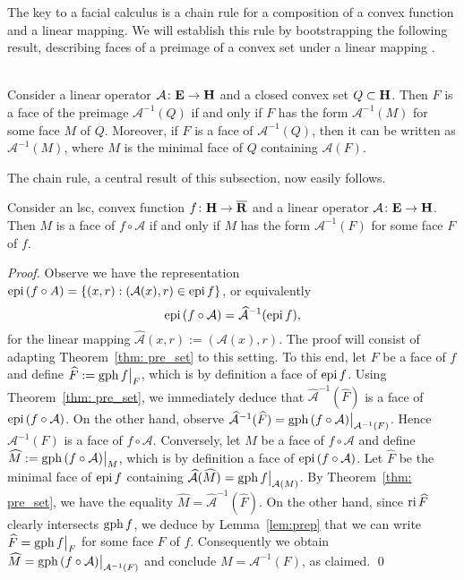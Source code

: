 \documentclass[smallextended,numbook]{svjour3}
\begin{document}
The key to a facial calculus is a chain rule for a composition of a convex function and a linear mapping. We will establish this rule by bootstrapping the following result, describing faces of a preimage of  a convex set under a linear mapping \cite{handbook}.
\begin{thm}\label{thm: pre_set} \hfill \\
Consider a linear operator $\mathcal{A}\colon{{\bf E}}\to{\bf H}$ and a closed convex set $Q\subset{\bf H}$. Then
$F$ is a face of the preimage $\mathcal{A}^{-1}(Q)$ if and only if $F$ has the form $\mathcal{A}^{-1}(M)$ for some face $M$ of $Q$. Moreover, if $F$ is a face of $\mathcal{A}^{-1}(Q)$, then it can be written as $\mathcal{A}^{-1}(M)$, where $M$ is the minimal face of $Q$ containing ${\mathcal{A}}(F)$.
\end{thm}

The chain rule, a central result of this subsection, now easily follows. 
\begin{thm}\label{thm:chain_gen}
Consider an lsc, convex function $f\colon{\bf H}\to\overline{{\bf R}}$ and a linear operator $\mathcal{A}\colon{{\bf E}}\to{\bf H}$. Then $M$ is a face of $f\circ\mathcal{A}$ if and only if $M$ has the form $\mathcal{A}^{-1}(F)$ for some face $F$ of $f$.
\end{thm}
\begin{proof}
Observe we have the representation ${\mbox{\rm epi}\,} (f\circ A)=\{(x,r):(\mathcal{A}(x),r)\in{\mbox{\rm epi}\,} f\}$, or equivalently 
$${\mbox{\rm epi}\,} (f\circ {\mathcal{A}})=\widehat{\mathcal{A}}^{-1}({\mbox{\rm epi}\,} f),$$
for the linear mapping $\widehat{\mathcal{A}}(x,r):=(\mathcal{A}(x),r)$. The proof will consist of adapting Theorem~\ref{thm: pre_set} to this setting. To this end,
let $F$ be a face of $f$ and define $\widehat{F}:={\mbox{\rm gph}\,} f\big|_F$, which is by definition a face of ${\mbox{\rm epi}\,} f$. Using Theorem~\ref{thm: pre_set}, we immediately deduce that $\widehat{\mathcal{A}}^{-1}(\widehat{F})$ is a face of ${\mbox{\rm epi}\,} (f\circ {\mathcal{A}})$.
On the other hand, observe $\widehat{\mathcal{A}}^{-1}(\widehat{F})= {\mbox{\rm gph}\,} (f\circ {\mathcal{A}})\big|_{{\mathcal{A}}^{-1}(F)}$. Hence $\mathcal{A}^{-1}(F)$ is a face of $f\circ{\mathcal{A}}$. Conversely, let $M$ be a face of $f\circ{\mathcal{A}}$ and define $\widehat{M}:={\mbox{\rm gph}\,} (f\circ{\mathcal{A}})\big|_M$, which is by definition a face of ${\mbox{\rm epi}\,} (f\circ{\mathcal{A}})$.
Let $\widehat{F}$ be the minimal face of ${\mbox{\rm epi}\,} f$ containing $\widehat{\mathcal{A}}(\widehat{M})= {\mbox{\rm gph}\,} f\big|_{{\mathcal{A}}(M)}$.  By Theorem~\ref{thm: pre_set}, we have the equality $\widehat{M}=\widehat{\mathcal{A}}^{-1}(\widehat{F})$. On the other hand, since ${\mbox{\rm ri}\,} \widehat{F}$ clearly intersects ${\mbox{\rm gph}\,} f$, we deduce by Lemma~\ref{lem:prep} that we can write $\widehat{F}={\mbox{\rm gph}\,} f\big|_F$ for some face $F$ of $f$. Consequently we obtain $\widehat{M}={\mbox{\rm gph}\,} (f\circ{\mathcal{A}})\big|_{{\mathcal{A}}^{-1}(F)}$ and conclude $M={\mathcal{A}}^{-1}(F)$, as claimed.
\qed
\end{proof}
\end{document}
